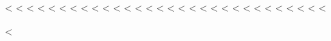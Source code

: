 <%
\ifpdftex
<%
<%
<%
<%
<%
<%
<%
<%
<%
<%
<%
<%
<%
<%
<%
<%
<%
<%
<%
<%
<%
<%
<%
<%
<%
<%
\fi
<%
<%
<%


\usepackage{chngcntr}
<%

\lstloadlanguages{%
}
